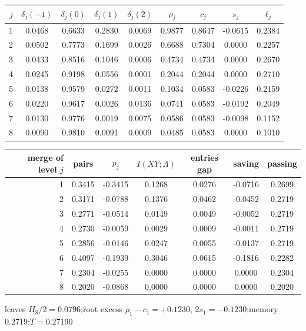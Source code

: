 \begin{tabular}{rcccccccc}
\toprule
$j$ & $\delta_j(-1)$ & $\delta_j(0)$ & $\delta_j(1)$ & $\delta_j(2)$ & $\rho_j$ & $c_j$ & $s_j$ & $\ell_j$ \\
\midrule
1 & 0.0468 & 0.6633 & 0.2830 & 0.0069 & 0.9877 & 0.8647 & -0.0615 & 0.2384 \\
2 & 0.0502 & 0.7773 & 0.1699 & 0.0026 & 0.6688 & 0.7304 & 0.0000 & 0.2257 \\
3 & 0.0433 & 0.8516 & 0.1046 & 0.0006 & 0.4734 & 0.4734 & 0.0000 & 0.2670 \\
4 & 0.0245 & 0.9198 & 0.0556 & 0.0001 & 0.2044 & 0.2044 & 0.0000 & 0.2710 \\
5 & 0.0138 & 0.9579 & 0.0272 & 0.0011 & 0.1034 & 0.0583 & -0.0226 & 0.2159 \\
6 & 0.0220 & 0.9617 & 0.0026 & 0.0136 & 0.0741 & 0.0583 & -0.0192 & 0.2049 \\
7 & 0.0130 & 0.9776 & 0.0019 & 0.0075 & 0.0586 & 0.0583 & -0.0098 & 0.1152 \\
8 & 0.0090 & 0.9810 & 0.0091 & 0.0009 & 0.0485 & 0.0583 & 0.0000 & 0.1010 \\
\bottomrule
\end{tabular}

\medskip

\begin{tabular}{rcccccc}
\toprule
merge of level $j$ & pairs & $p_j$ & $I(XY;\Lambda)$ & entries gap & saving & passing \\
\midrule
1 & 0.3415 & -0.3415 & 0.1268 & 0.0276 & -0.0716 & 0.2699 \\
2 & 0.3171 & -0.0788 & 0.1376 & 0.0462 & -0.0452 & 0.2719 \\
3 & 0.2771 & -0.0514 & 0.0149 & 0.0049 & -0.0052 & 0.2719 \\
4 & 0.2730 & -0.0059 & 0.0029 & 0.0009 & -0.0011 & 0.2719 \\
5 & 0.2856 & -0.0146 & 0.0247 & 0.0055 & -0.0137 & 0.2719 \\
6 & 0.4097 & -0.1939 & 0.3046 & 0.0615 & -0.1816 & 0.2282 \\
7 & 0.2304 & -0.0255 & 0.0000 & 0.0000 & 0.0000 & 0.2304 \\
8 & 0.2020 & -0.0868 & 0.0000 & 0.0000 & 0.0000 & 0.2020 \\
\bottomrule
\end{tabular}

\smallskip
{\footnotesize leaves $H_8/2 = 0.0796$;\quad root excess $\rho_1-c_1 = +0.1230$, $2s_1 = -0.1230$;\quad memory $0.2719$;\quad $T = 0.27190$}

